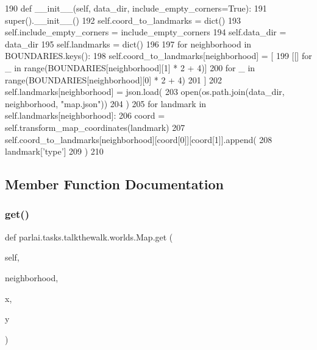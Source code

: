 \begin{DoxyCode}
190     \textcolor{keyword}{def }\_\_init\_\_(self, data\_dir, include\_empty\_corners=True):
191         super().\_\_init\_\_()
192         self.coord\_to\_landmarks = dict()
193         self.include\_empty\_corners = include\_empty\_corners
194         self.data\_dir = data\_dir
195         self.landmarks = dict()
196 
197         \textcolor{keywordflow}{for} neighborhood \textcolor{keywordflow}{in} BOUNDARIES.keys():
198             self.coord\_to\_landmarks[neighborhood] = [
199                 [[] \textcolor{keywordflow}{for} \_ \textcolor{keywordflow}{in} range(BOUNDARIES[neighborhood][1] * 2 + 4)]
200                 \textcolor{keywordflow}{for} \_ \textcolor{keywordflow}{in} range(BOUNDARIES[neighborhood][0] * 2 + 4)
201             ]
202             self.landmarks[neighborhood] = json.load(
203                 open(os.path.join(data\_dir, neighborhood, \textcolor{stringliteral}{"map.json"}))
204             )
205             \textcolor{keywordflow}{for} landmark \textcolor{keywordflow}{in} self.landmarks[neighborhood]:
206                 coord = self.transform\_map\_coordinates(landmark)
207                 self.coord\_to\_landmarks[neighborhood][coord[0]][coord[1]].append(
208                     landmark[\textcolor{stringliteral}{'type'}]
209                 )
210 
\end{DoxyCode}


\subsection{Member Function Documentation}
\mbox{\label{classparlai_1_1tasks_1_1talkthewalk_1_1worlds_1_1Map_abb0b69a2cbaa77c9e422c0a7dc039974}} 
\subsubsection{\texorpdfstring{get()}{get()}}
{\footnotesize\ttfamily def parlai.\+tasks.\+talkthewalk.\+worlds.\+Map.\+get (\begin{DoxyParamCaption}\item[{}]{self,  }\item[{}]{neighborhood,  }\item[{}]{x,  }\item[{}]{y }\end{DoxyParamCaption})}



